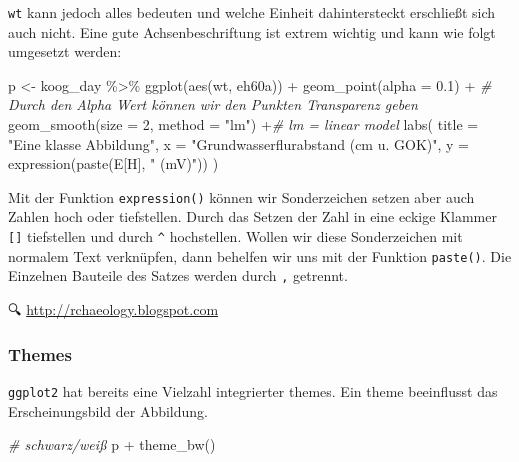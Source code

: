 \documentclass[
]{article}
\newenvironment{Shaded}{\begin{snugshade}}{\end{snugshade}}
\newcommand{\AttributeTok}[1]{\textcolor[rgb]{0.77,0.63,0.00}{#1}}
\newcommand{\CommentTok}[1]{\textcolor[rgb]{0.56,0.35,0.01}{\textit{#1}}}
\newcommand{\DecValTok}[1]{\textcolor[rgb]{0.00,0.00,0.81}{#1}}
\newcommand{\FloatTok}[1]{\textcolor[rgb]{0.00,0.00,0.81}{#1}}
\newcommand{\FunctionTok}[1]{\textcolor[rgb]{0.00,0.00,0.00}{#1}}
\newcommand{\NormalTok}[1]{#1}
\newcommand{\OtherTok}[1]{\textcolor[rgb]{0.56,0.35,0.01}{#1}}
\newcommand{\SpecialCharTok}[1]{\textcolor[rgb]{0.00,0.00,0.00}{#1}}
\newcommand{\StringTok}[1]{\textcolor[rgb]{0.31,0.60,0.02}{#1}}
\begin{document}
\texttt{wt} kann jedoch alles bedeuten und welche Einheit dahintersteckt erschließt sich auch nicht. Eine gute Achsenbeschriftung ist extrem wichtig und kann wie folgt umgesetzt werden:

\begin{Shaded}
\begin{Highlighting}[]
\NormalTok{p }\OtherTok{\textless{}{-}}\NormalTok{ koog\_day  }\SpecialCharTok{\%\textgreater{}\%}
  \FunctionTok{ggplot}\NormalTok{(}\FunctionTok{aes}\NormalTok{(wt, eh60a)) }\SpecialCharTok{+}
  \FunctionTok{geom\_point}\NormalTok{(}\AttributeTok{alpha =} \FloatTok{0.1}\NormalTok{) }\SpecialCharTok{+} \CommentTok{\# Durch den Alpha Wert können wir den Punkten Transparenz geben}
  \FunctionTok{geom\_smooth}\NormalTok{(}\AttributeTok{size =} \DecValTok{2}\NormalTok{, }\AttributeTok{method =} \StringTok{"lm"}\NormalTok{) }\SpecialCharTok{+}\CommentTok{\# lm = linear model}
  \FunctionTok{labs}\NormalTok{(}
    \AttributeTok{title =} \StringTok{"Eine klasse Abbildung"}\NormalTok{,}
    \AttributeTok{x =} \StringTok{"Grundwasserflurabstand (cm u. GOK)"}\NormalTok{, }
    \AttributeTok{y =} \FunctionTok{expression}\NormalTok{(}\FunctionTok{paste}\NormalTok{(E[H], }\StringTok{" (mV)"}\NormalTok{))}
\NormalTok{  )}
\end{Highlighting}
\end{Shaded}

Mit der Funktion \texttt{expression()} können wir Sonderzeichen setzen aber auch Zahlen hoch oder tiefstellen. Durch das Setzen der Zahl in eine eckige Klammer \texttt{{[}{]}} tiefstellen und durch \texttt{\^{}} hochstellen. Wollen wir diese Sonderzeichen mit normalem Text verknüpfen, dann behelfen wir uns mit der Funktion \texttt{paste()}. Die Einzelnen Bauteile des Satzes werden durch \texttt{,} getrennt.

🔍 \href{http://rchaeology.blogspot.com/2012/11/combining-superscripts-subscripts-and.html}{http://rchaeology.blogspot.com}

\hypertarget{themes}{%
\subsubsection{Themes}\label{themes}}

\texttt{ggplot2} hat bereits eine Vielzahl integrierter themes. Ein theme beeinflusst das Erscheinungsbild der Abbildung.

\begin{Shaded}
\begin{Highlighting}[]
\CommentTok{\# schwarz/weiß}
\NormalTok{p }\SpecialCharTok{+} \FunctionTok{theme\_bw}\NormalTok{()}
\end{Highlighting}
\end{Shaded}
\end{document}
